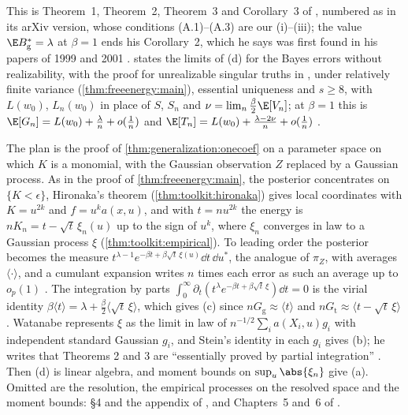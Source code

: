 \begin{refsection}
This is Theorem~1, Theorem~2, Theorem~3 and Corollary~3 of \textcite{Watanabe2010a}, numbered as in its arXiv version, whose conditions (A.1)--(A.3) are our (i)--(iii); the value $\E B_{\mathrm g}^*=\lambda$ at $\beta=1$ ends his Corollary~2, which he says was first found in his papers of 1999 and 2001 \parencite{Watanabe1999,Watanabe2001a}. \Textcite[Lemma~3]{Watanabe2010} states the limits of (d) for the Bayes errors without realizability, with the proof for unrealizable singular truths in \textcite{Watanabe2010d}, under relatively finite variance (\cref{thm:freeenergy:main}), essential uniqueness and $s\ge8$, with $L(w_0)$, $L_n(w_0)$ in place of $S$, $S_n$ and $\nu=\lim_n\frac\beta2\E[V_n]$; at $\beta=1$ this is $\E[G_n]=L(w_0)+\frac\lambda n+o(\frac1n)$ and $\E[T_n]=L(w_0)+\frac{\lambda-2\nu}n+o(\frac1n)$ \parencite{Watanabe2024}.

\begin{proofsketch}
The plan is the proof of \cref{thm:generalization:onecoef} on a parameter space on which $K$ is a monomial, with the Gaussian observation $Z$ replaced by a Gaussian process. As in the proof of \cref{thm:freeenergy:main}, the posterior concentrates on $\{K<\epsilon\}$, Hironaka's theorem (\cref{thm:toolkit:hironaka}) gives local coordinates with $K=u^{2k}$ and $f=u^ka(x,u)$, and with $t=nu^{2k}$ the energy is $nK_n=t-\sqrt t\,\xi_n(u)$ up to the sign of $u^k$, where $\xi_n$ converges in law to a Gaussian process $\xi$ (\cref{thm:toolkit:empirical}). To leading order the posterior becomes the measure $t^{\lambda-1}e^{-\beta t+\beta\sqrt t\,\xi(u)}\dd t\,\dd u^*$, the analogue of $\pi_Z$, with averages $\langle\cdot\rangle$, and a cumulant expansion writes $n$ times each error as such an average up to $o_p(1)$ \parencite[\S5]{Watanabe2024}. The integration by parts $\int_0^\infty\partial_t(t^\lambda e^{-\beta t+\beta\sqrt t\,\xi})\dd t=0$ is the virial identity $\beta\langle t\rangle=\lambda+\frac\beta2\langle\sqrt t\,\xi\rangle$, which gives (c) since $nG_{\mathrm g}\approx\langle t\rangle$ and $nG_{\mathrm t}\approx\langle t-\sqrt t\,\xi\rangle$. Watanabe represents $\xi$ as the limit in law of $n^{-1/2}\sum_ia(X_i,u)g_i$ with independent standard Gaussian $g_i$, and Stein's identity in each $g_i$ gives (b); he writes that Theorems 2 and 3 are ``essentially proved by partial integration'' \parencite[\S5]{Watanabe2010a}. Then (d) is linear algebra, and moment bounds on $\sup_u\abs{\xi_n}$ give (a). Omitted are the resolution, the empirical processes on the resolved space and the moment bounds: \S4 and the appendix of \textcite{Watanabe2010a}, and Chapters~5 and~6 of \textcite{Watanabe2009}.
\end{proofsketch}


\end{refsection}
